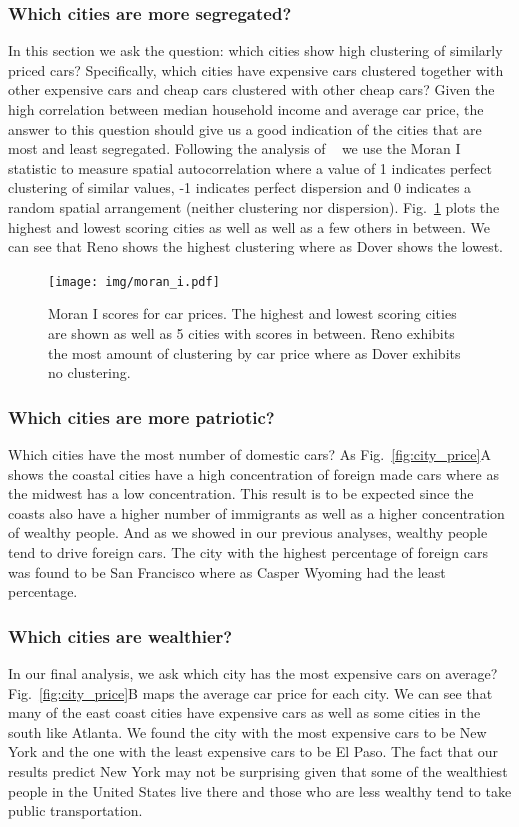 \documentclass[10pt,twocolumn,letterpaper]{article}
\begin{document}
\subsubsection{Which cities are more segregated?}
In this section we ask the question: which cities show high clustering of similarly priced cars? Specifically, which cities have expensive cars clustered together with other expensive cars and cheap cars clustered with other cheap cars? Given the high correlation between median household income and average car price, the answer to this question should give us a good indication of the cities that are most and least segregated. Following the analysis of ~\cite{mit_plos_1} we use the Moran I statistic to measure spatial autocorrelation where a value of 1 indicates perfect clustering of similar values, -1 indicates perfect dispersion and 0 indicates a random spatial arrangement (neither clustering nor dispersion). Fig.~\ref{fig:moran-i} plots the highest and lowest scoring cities as well as well as a few others in between. We can see that Reno shows the highest clustering where as Dover shows the lowest.

\begin{figure}[t]
\begin{center}
    \texttt{[image: img/moran\_i.pdf]}
\end{center}
   \caption {Moran I scores for car prices. The highest and lowest scoring cities are shown as well as 5 cities with scores in between. Reno exhibits the most amount of clustering by car price where as Dover exhibits no clustering.} 
\label{fig:moran-i}
\end{figure}

\subsubsection{Which cities are more patriotic?}
Which cities have the most number of domestic cars? As Fig.~\ref{fig:city_price}A shows the coastal cities have a high concentration of foreign made cars where as the midwest has a low concentration. This result is to be expected since the coasts also have a higher number of immigrants as well as a higher concentration of wealthy people. And as we showed in our previous analyses, wealthy people tend to drive foreign cars. The city with the highest percentage of foreign cars was found to be San Francisco where as Casper Wyoming had the least percentage.

\subsubsection{Which cities are wealthier?}
In our final analysis, we ask which city has the most expensive cars on average? Fig.~\ref{fig:city_price}B maps the average car price for each city. We can see that many of the east coast cities have expensive cars as well as some cities in the south like Atlanta. We found the city with the most expensive cars to be New York and the one with the least expensive cars to be El Paso. The fact that our results predict New York may not be surprising given that some of the wealthiest people in the United States live there and those who are less wealthy tend to take public transportation.
\end{document}
